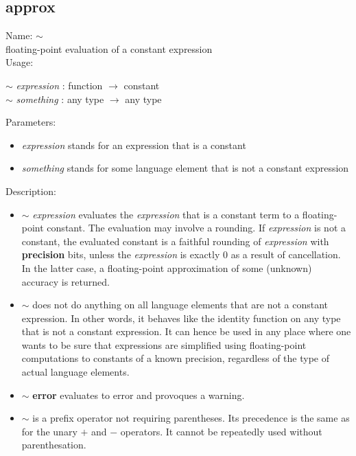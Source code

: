 \subsection{approx}
\label{labapprox}
\noindent Name: \textbf{$\sim$}\\
floating-point evaluation of a constant expression\\

\noindent Usage: 
\begin{center}
\textbf{$\sim$} \emph{expression} : \textsf{function} $\rightarrow$ \textsf{constant}\\
\textbf{$\sim$} \emph{something} : \textsf{any type} $\rightarrow$ \textsf{any type}\\
\end{center}
Parameters: 
\begin{itemize}
\item \emph{expression} stands for an expression that is a constant
\item \emph{something} stands for some language element that is not a constant expression
\end{itemize}
\noindent Description: \begin{itemize}

\item \textbf{$\sim$} \emph{expression} evaluates the \emph{expression} that is a constant
   term to a floating-point constant. The evaluation may involve a
   rounding. If \emph{expression} is not a constant, the evaluated constant is
   a faithful rounding of \emph{expression} with \textbf{precision} bits, unless the
   \emph{expression} is exactly $0$ as a result of cancellation. In the
   latter case, a floating-point approximation of some (unknown) accuracy
   is returned.

\item \textbf{$\sim$} does not do anything on all language elements that are not a
   constant expression.  In other words, it behaves like the identity
   function on any type that is not a constant expression. It can hence
   be used in any place where one wants to be sure that expressions are
   simplified using floating-point computations to constants of a known
   precision, regardless of the type of actual language elements.

\item \textbf{$\sim$} \textbf{error} evaluates to error and provoques a warning.

\item \textbf{$\sim$} is a prefix operator not requiring parentheses. Its
   precedence is the same as for the unary $+$ and $-$
   operators. It cannot be repeatedly used without parenthesation.
\end{itemize}
